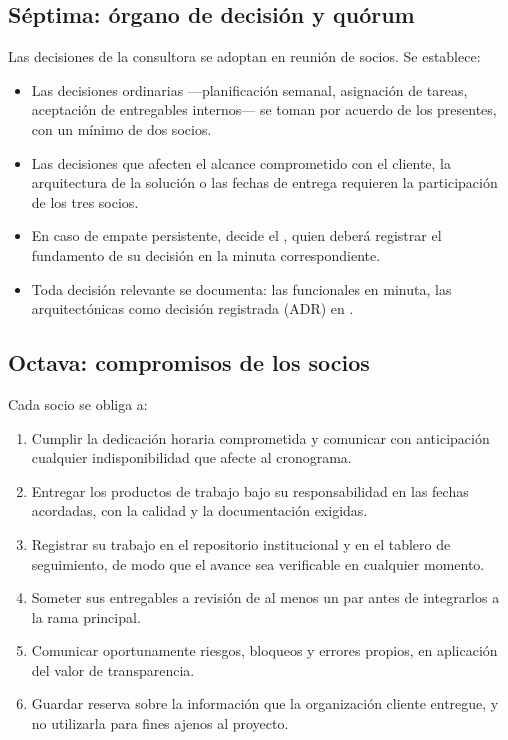 \subsection{Séptima: órgano de decisión y quórum}

Las decisiones de la consultora se adoptan en reunión de socios. Se establece:

\begin{itemize}
  \item Las decisiones ordinarias —planificación semanal, asignación de tareas,
        aceptación de entregables internos— se toman por acuerdo de los presentes,
        con un mínimo de dos socios.
  \item Las decisiones que afecten el alcance comprometido con el cliente, la
        arquitectura de la solución o las fechas de entrega requieren la
        participación de los tres socios.
  \item En caso de empate persistente, decide el \lgDirectorRol, quien deberá
        registrar el fundamento de su decisión en la minuta correspondiente.
  \item Toda decisión relevante se documenta: las funcionales en minuta, las
        arquitectónicas como decisión registrada (ADR) en
        .
\end{itemize}

\subsection{Octava: compromisos de los socios}

Cada socio se obliga a:

\begin{enumerate}
  \item Cumplir la dedicación horaria comprometida y comunicar con anticipación
        cualquier indisponibilidad que afecte al cronograma.
  \item Entregar los productos de trabajo bajo su responsabilidad en las fechas
        acordadas, con la calidad y la documentación exigidas.
  \item Registrar su trabajo en el repositorio institucional y en el tablero de
        seguimiento, de modo que el avance sea verificable en cualquier momento.
  \item Someter sus entregables a revisión de al menos un par antes de
        integrarlos a la rama principal.
  \item Comunicar oportunamente riesgos, bloqueos y errores propios, en
        aplicación del valor de transparencia.
  \item Guardar reserva sobre la información que la organización cliente
        entregue, y no utilizarla para fines ajenos al proyecto.
\end{enumerate}

